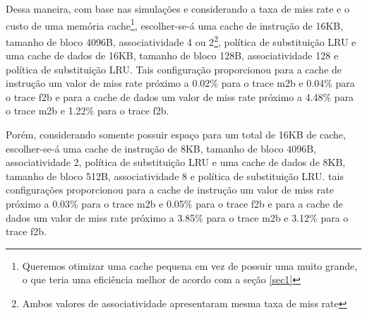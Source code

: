 \documentclass[10pt,a4paper]{article}
\begin{document}
Dessa maneira, com base nas simulações e considerando a taxa de miss rate e o custo de uma memória
cache\footnote{Queremos otimizar uma cache pequena em vez de possuir
  uma muito grande, o que teria uma eficiência melhor de acordo com a
seção \ref{sec1}}, escolher-se-á uma cache de instrução de 16KB, tamanho
de bloco 4096B, associatividade 4 ou 2\footnote{Ambos valores de
  associatividade apresentaram mesma taxa de miss rate}, política de
substituição LRU e uma cache de dados de 16KB, tamanho
de bloco 128B, associatividade 128 e política de substituição LRU.
Tais configuração proporcionou para a cache de instrução um valor de miss rate próximo a 0.02\% para o
trace m2b e 0.04\% para o trace f2b e para a cache de dados um valor de miss rate próximo a 4.48\% para o
trace m2b e 1.22\% para o trace f2b.

Porém, considerando somente possuir espaço para um total de 16KB de cache, 
escolher-se-á uma cache de instrução de 8KB, tamanho
de bloco 4096B, associatividade  2,  política de substituição LRU 
e uma cache de dados de 8KB, tamanho de bloco 512B, associatividade 8 e política de substituição LRU.
tais configurações proporcionou para a cache de instrução um valor de miss rate próximo a 0.03\% para o
trace m2b e 0.05\% para o trace f2b e para a cache de dados um valor de miss rate próximo a 3.85\% para o
trace m2b e 3.12\% para o trace f2b.




\begin{small}
  
\end{small}
\end{document}
